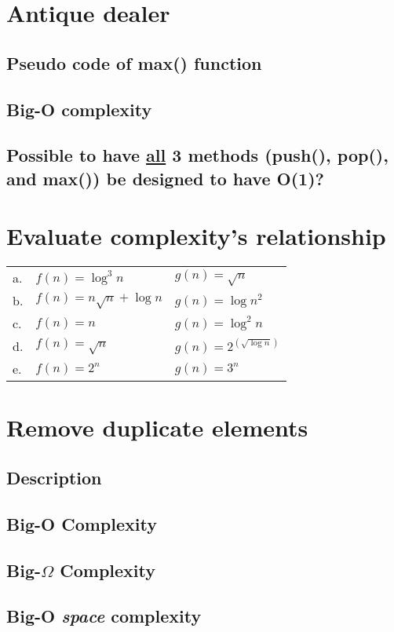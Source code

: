 \documentclass[16pt, letterpaper]{article}
\begin{document}
\section{Antique dealer}
\subsection{Pseudo code of max() function}
\subsection{Big-O complexity}
\subsection{Possible to have \underline{all}  3 methods (push(), pop(), and max()) be designed to have O(1)?}

\section{Evaluate complexity's relationship}
\begin{tabular}{l l l}
a. & $f(n) = {\log^3 n}$ & $g(n) = \sqrt n$ \\
b. & $f(n) = n\sqrt n + \log n$ & $g(n) = \log n^2 $ \\
c. & $f(n) = n $ & $g(n) = \log^2 n$ \\
d. & $f(n) = \sqrt n $ & $g(n) = 2^(\sqrt {\log n})$ \\
e. & $f(n) = 2^n $ & $g(n) = 3^n$
\end{tabular}

\section{Remove duplicate elements}
\subsection{Description}
\subsection{Big-O Complexity}
\subsection{Big-$\Omega$ Complexity}
\subsection{Big-O \emph{space} complexity}
\end{document}
